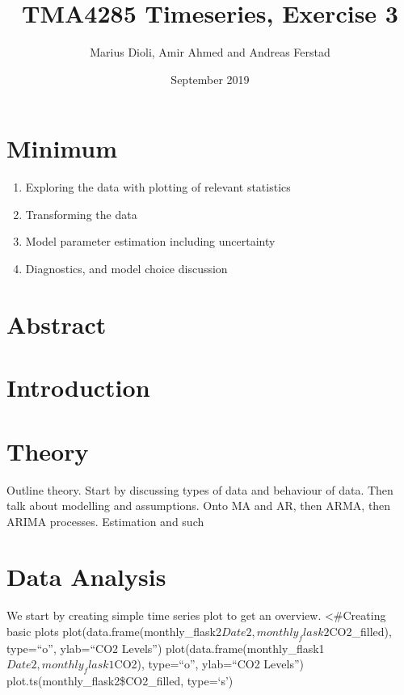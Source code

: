 \documentclass[]{article}
\title{TMA4285 Timeseries, Exercise 3}
\author{Marius Dioli, Amir Ahmed and Andreas Ferstad}
\date{September 2019}
\providecommand{\tightlist}{%
  \setlength{\itemsep}{0pt}\setlength{\parskip}{0pt}}
\begin{document}
\maketitle

\hypertarget{minimum}{%
\section{Minimum}\label{minimum}}

\begin{enumerate}
\def\labelenumi{\arabic{enumi}.}
\tightlist
\item
  Exploring the data with plotting of relevant statistics
\item
  Transforming the data
\item
  Model parameter estimation including uncertainty
\item
  Diagnostics, and model choice discussion
\end{enumerate}

\hypertarget{abstract}{%
\section{Abstract}\label{abstract}}

\hypertarget{introduction}{%
\section{Introduction}\label{introduction}}

\hypertarget{theory}{%
\section{Theory}\label{theory}}

Outline theory. Start by discussing types of data and behaviour of data.
Then talk about modelling and assumptions. Onto MA and AR, then ARMA,
then ARIMA processes. Estimation and such

\hypertarget{data-analysis}{%
\section{Data Analysis}\label{data-analysis}}

We start by creating simple time series plot to get an overview.
\textless\#Creating basic plots
plot(data.frame(monthly\_flask2\(Date2, monthly_flask2\)CO2\_filled),
type=``o'', ylab=``CO2 Levels'')
plot(data.frame(monthly\_flask1\(Date2, monthly_flask1\)CO2),
type=``o'', ylab=``CO2 Levels'') plot.ts(monthly\_flask2\$CO2\_filled,
type=`s')
\end{document}
